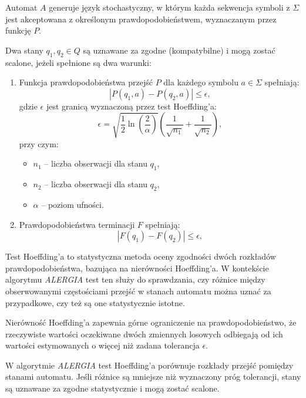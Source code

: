 Automat \( A \) generuje język stochastyczny, w którym każda sekwencja symboli z \( \Sigma \) jest akceptowana z określonym prawdopodobieństwem, wyznaczanym przez funkcję \( P \).

\begin{definition}  
\label{def:alergia_state_compatibility}
Dwa stany \( q_1, q_2 \in Q \) są uznawane za zgodne (kompatybilne) i mogą zostać scalone, jeżeli spełnione są dwa warunki:  
\begin{enumerate}
    \item Funkcja prawdopodobieństwa przejść \( P \) dla każdego symbolu \( a \in \Sigma \) spełniają:  
    \[
    |P(q_1, a) - P(q_2, a)| \leq \epsilon,
    \]  
    gdzie \( \epsilon \) jest granicą wyznaczoną przez test Hoeffding’a:  
    \[
    \epsilon = \sqrt{\frac{1}{2} \ln\left(\frac{2}{\alpha}\right)} \left( \frac{1}{\sqrt{n_1}} + \frac{1}{\sqrt{n_2}} \right),
    \]  
    przy czym:  
    \begin{itemize}  
        \item \( n_1 \) – liczba obserwacji dla stanu \( q_1 \),  
        \item \( n_2 \) – liczba obserwacji dla stanu \( q_2 \),  
        \item \( \alpha \) – poziom ufności.  
    \end{itemize}
    \item Prawdopodobieństwa terminacji \( F \) spełniają:
    \[
    |F(q_1) - F(q_2)| \leq \epsilon,
    \]  
\end{enumerate}
\end{definition}

Test Hoeffding’a to statystyczna metoda oceny zgodności dwóch rozkładów prawdopodobieństwa, bazująca na nierówności Hoeffding’a. W kontekście algorytmu \textit{ALERGIA} test ten służy do sprawdzania, czy różnice między obserwowanymi częstościami przejść w stanach automatu można uznać za przypadkowe, czy też są one statystycznie istotne.  

Nierówność Hoeffding’a zapewnia górne ograniczenie na prawdopodobieństwo, że rzeczywiste wartości oczekiwane dwóch zmiennych losowych odbiegają od ich wartości estymowanych o więcej niż zadana tolerancja \( \epsilon \). 

W algorytmie \textit{ALERGIA} test Hoeffding’a porównuje rozkłady przejść pomiędzy stanami automatu. Jeśli różnice są mniejsze niż wyznaczony próg tolerancji, stany są uznawane za zgodne statystycznie i mogą zostać scalone.  

